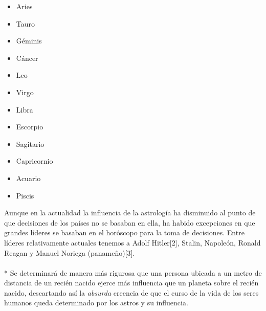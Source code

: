 \documentclass[a4paper,11pt]{article}
\begin{document}
\begin{itemize}
\item{Aries}
\item{Tauro}
\item{G\'eminis}
\item{C\'ancer}
\item{Leo}
\item{Virgo}
\item{Libra}
\item{Escorpio}
\item{Sagitario}
\item{Capricornio}
\item{Acuario}
\item{Piscis}
\end{itemize}

Aunque en la actualidad la influencia de la astrolog\'ia ha disminuido al punto de que decisiones de los pa\'ises no se basaban
en ella, ha habido excepciones en que grandes l\'ideres se basaban en el hor\'oscopo para la toma de decisiones.
Entre l\'ideres relativamente actuales tenemos a Adolf Hitler[2], Stalin, Napole\'on, Ronald Reagan y Manuel Noriega (panameño)[3].
\\ \\*
Se determinar\'a de manera m\'as rigurosa que una persona ubicada a un metro de distancia de un reci\'en nacido ejerce m\'as influencia que un planeta sobre el reci\'en nacido, descartando as\'i la \emph{absurda} creencia de que el curso de la vida de los seres humanos queda determinado por los astros y su influencia.
\end{document}
